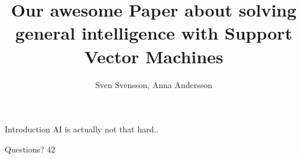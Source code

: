 \documentclass[xcolor=dvipsnames]{beamer}
\begin{document}
\title{{\bf Our awesome Paper about solving general intelligence with Support Vector Machines}}
\author{Sven Svensson, Anna Andersson}
\maketitle

\begin{frame}{Introduction}
\pause AI is actually not that hard..
\end{frame}

\begin{frame}{Questions?}
42
\end{frame}
\end{document}
